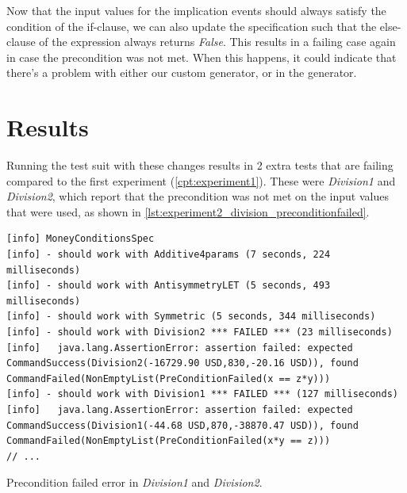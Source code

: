\FloatBarrier
Now that the input values for the implication events should always satisfy the condition of the if-clause, we can also update the specification such that the else-clause of the expression always returns \textit{False}. This results in a failing case again in case the precondition was not met. When this happens, it could indicate that there's a problem with either our custom generator, or in the generator.

\section{Results}
Running the test suit with these changes results in 2 extra tests that are failing compared to the first experiment (\autoref{cpt:experiment1}). These were \textit{Division1} and \textit{Division2}, which report that the precondition was not met on the input values that were used, as shown in \autoref{lst:experiment2_division_preconditionfailed}.
\begin{sourcecode}[!ht]
\begin{lstlisting}[language=Log]
[info] MoneyConditionsSpec
[info] - should work with Additive4params (7 seconds, 224 milliseconds)
[info] - should work with AntisymmetryLET (5 seconds, 493 milliseconds)
[info] - should work with Symmetric (5 seconds, 344 milliseconds)
[info] - should work with Division2 *** FAILED *** (23 milliseconds)
[info]   java.lang.AssertionError: assertion failed: expected CommandSuccess(Division2(-16729.90 USD,830,-20.16 USD)), found CommandFailed(NonEmptyList(PreConditionFailed(x == z*y)))
[info] - should work with Division1 *** FAILED *** (127 milliseconds)
[info]   java.lang.AssertionError: assertion failed: expected CommandSuccess(Division1(-44.68 USD,870,-38870.47 USD)), found CommandFailed(NonEmptyList(PreConditionFailed(x*y == z)))
// ...
\end{lstlisting}
\caption{Precondition failed error in \textit{Division1} and \textit{Division2}.}
\label{lst:experiment2_division_preconditionfailed}
\end{sourcecode}
\FloatBarrier

